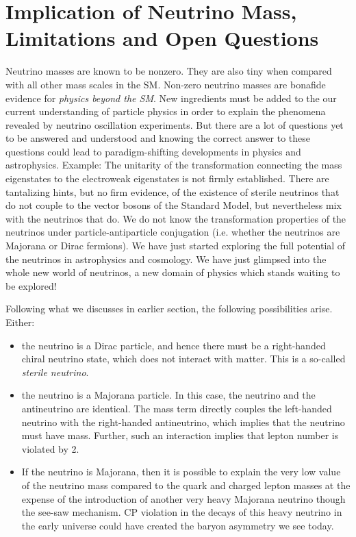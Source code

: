 \section{Implication of Neutrino Mass,  Limitations and Open Questions}

Neutrino masses are known to be nonzero. They are also tiny when compared with all other mass scales in the SM. Non-zero neutrino masses are bonafide evidence for \textit{physics beyond the SM}. New ingredients must be added to the our current understanding of particle physics in order to explain the phenomena revealed by neutrino oscillation experiments. But there are a lot of questions yet to be answered and understood and knowing the correct answer to these questions could lead to paradigm-shifting developments in physics and astrophysics.  Example: The unitarity of the transformation connecting the mass eigenstates to the electroweak eigenstates is not firmly established. There are tantalizing hints, but no firm evidence, of the existence of sterile neutrinos that do not couple to the vector bosons of the Standard Model, but nevertheless mix with the neutrinos that do. We do not know the transformation properties of the neutrinos under particle-antiparticle conjugation (i.e. whether the neutrinos are Majorana or Dirac fermions). We have just started exploring the full potential of the neutrinos in astrophysics and cosmology. We have just glimpsed into the whole new world of neutrinos, a new domain of physics which stands waiting to be explored!


Following what we discusses in earlier section, the following possibilities arise. Either: 
\begin{itemize}
    \item the neutrino is a Dirac particle, and hence there must be a right-handed chiral neutrino state, which does not interact with matter. This is a so-called \textit{sterile neutrino}.
    \item the neutrino is a Majorana particle. In this case, the neutrino and the antineutrino are identical. The mass term directly couples the left-handed neutrino with the right-handed antineutrino, which implies that the neutrino must have mass. Further, such an interaction implies that lepton number is violated by 2.
    \item If the neutrino is Majorana, then it is possible to explain the very low value of the neutrino mass compared to the quark and charged lepton masses at the expense of the introduction of another very heavy Majorana neutrino though the see-saw mechanism. \textsc{CP} violation in the decays of this heavy neutrino in the early universe could have created the baryon asymmetry we see today.
\end{itemize}




